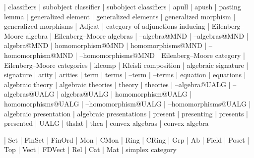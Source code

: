     |   classifiers
    |   subobject classifier
    |   subobject classifiers
    |   apull
    |   apush
    |   pasting lemma
    |   generalized element
    |   generalized elements
    |   generalized morphism
    |   generalized morphisms
    |   Adjcat
    |   category of adjunctions inducing
    |   Eilenberg--Moore algebra
    |   Eilenberg--Moore algebras
    |   --algebra@MND
    |   --algebras@MND
    |   algebra@MND
    |   homomorphism@MND
    |   homomorphisms@MND
    |   --homomorphism@MND
    |   --homomorphisms@MND
    |   Eilenberg--Moore category
    |   Eilenberg--Moore categories
    |   klcomp
    |   Kleisli composition
    |   algebraic signature
    |   signature
    |   arity
    |   arities
    |   term
    |   terms
    |   --term
    |   --terms
    |   equation
    |   equations
    |   algebraic theory
    |   algebraic theories
    |   theory
    |   theories
    |   --algebra@UALG
    |   --algebras@UALG
    |   algebra@UALG
    |   homomorphism@UALG
    |   homomorphisms@UALG
    |   --homomorphism@UALG
    |   --homomorphisms@UALG
    |   algebraic presentation
    |   algebraic presentations
    |   present
    |   presenting
    |   presents
    |   presented
    |   UALG
    |   thslat
    |   thca
    |   convex algebras
    |   convex algebra



    |   Set
    |   FinSet
    |   FinOrd
    |   Mon
    |   CMon
    |   Ring
    |   CRing
    |   Grp
    |   Ab
    |   Field
    |   Poset
    |   Top
    |   Vect
    |   FDVect
    |   Rel
    |   Cat
    |   Mat
    |   simplex category

